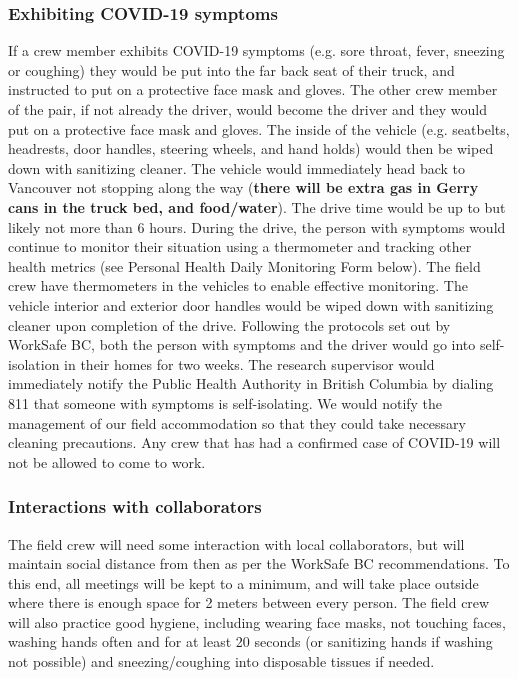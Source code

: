 \documentclass[11pt,letter]{article}
\begin{document}
\subsubsection{Exhibiting COVID-19 symptoms}
If a crew member exhibits COVID-19 symptoms (e.g. sore throat, fever, sneezing or coughing) they would be put into the far back seat of their truck, and instructed to put on a protective face mask and gloves. The other crew member of the pair, if not already the driver, would become the driver and they would put on a protective face mask and gloves. The inside of the vehicle (e.g. seatbelts, headrests, door handles, steering wheels, and hand holds) would then be wiped down with sanitizing cleaner. The vehicle would immediately head back to Vancouver not stopping along the way (\textbf{there will be extra gas in Gerry cans in the truck bed, and food/water}). The drive time would be up to but likely not more than 6 hours. During the drive, the person with symptoms would continue to monitor their situation using a thermometer and tracking other health metrics (see Personal Health Daily Monitoring Form below). The field crew have thermometers in the vehicles to enable effective monitoring. The vehicle interior and exterior door handles would be wiped down with sanitizing cleaner upon completion of the drive. Following the protocols set out by WorkSafe BC, both the person with symptoms and the driver would go into self-isolation in their homes for two weeks. The research supervisor would immediately notify the Public Health Authority in British Columbia by dialing 811 that someone with symptoms is self-isolating. We would notify the management of our field accommodation so that they could take necessary cleaning precautions.  Any crew that has had a confirmed case of COVID-19 will not be allowed to come to work.

\subsubsection{Interactions with collaborators}
The field crew will need some interaction with local collaborators, but will maintain social distance from then as per the WorkSafe BC recommendations. To this end, all meetings will be kept to a minimum, and will take place outside where there is enough space for 2 meters between every person. The field crew will also practice good hygiene, including wearing face masks, not touching faces, washing hands often and for at least 20 seconds (or sanitizing hands if washing not possible) and sneezing/coughing into disposable tissues if needed.  
\end{document}
